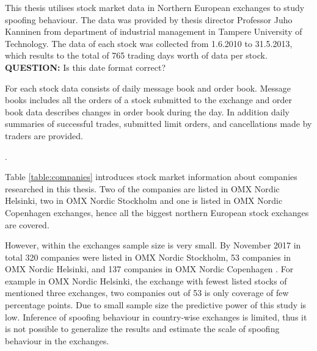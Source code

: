 \documentclass{tut-thesis}
\begin{document}
This thesis utilises stock market data in Northern European exchanges to study spoofing behaviour. The data was provided by thesis director Professor Juho Kanninen from department of industrial management in Tampere University of Technology. The data of each stock was collected from 1.6.2010 to 31.5.2013, which results to the total of 765 trading days worth of data per stock. \textbf{QUESTION:} Is this date format correct?

For each stock data consists of daily message book and order book. Message books includes all the orders of a stock submitted to the exchange and order book data describes changes in order book during the day. In addition daily summaries of successful trades, submitted limit orders, and cancellations made by traders are provided. %


.

Table \ref{table:companies} introduces stock market information about companies researched in this thesis. Two of the companies are listed in OMX Nordic Helsinki, two in OMX Nordic Stockholm and one is listed in OMX Nordic Copenhagen exchanges, hence all the biggest northern European stock exchanges are 
covered.

However, within the exchanges sample size is very small. By November 2017 in total 320 companies were listed in OMX Nordic Stockholm, 53 companies in OMX Nordic Helsinki, and 137 companies in OMX Nordic Copenhagen \autocite{GlobeNewswire2018b}. For example in OMX Nordic Helsinki, the exchange with fewest listed stocks of mentioned three exchanges, two companies out of 53 is only coverage of few percentage points. Due to small sample size the predictive power of this study is low. Inference of spoofing behaviour in country-wise exchanges is limited, thus it is not possible to generalize the results and estimate the scale of spoofing behaviour in the exchanges. 
\end{document}

